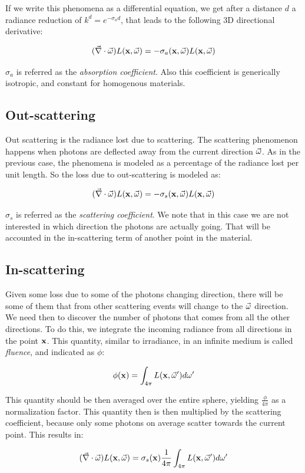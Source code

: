 If we write this phenomena as a differential equation, we get after a distance $d$ a radiance reduction of $k^d = e^{-\sigma_a d}$, that leads to the following 3D directional derivative:

$$
(\vec{\nabla} \cdot \vec{\omega}) L(\mathbf{x}, \vec{\omega}) = -\sigma_a(\mathbf{x},\vec{\omega}) L(\mathbf{x}, \vec{\omega})
$$

$\sigma_a$ is referred as the \emph{absorption coefficient}. Also this coefficient is generically isotropic, and constant for homogenous materials.

\subsection{Out-scattering}
Out scattering is the radiance lost due to scattering. The scattering phenomenon happens when photons are deflected away from the current direction $\vec{\omega}$.  As in the previous case, the phenomena is modeled as a percentage of the radiance lost per unit length. So the loss due to out-scattering is modeled as:

$$
(\vec{\nabla} \cdot \vec{\omega}) L(\mathbf{x}, \vec{\omega}) = -\sigma_s(\mathbf{x},\vec{\omega}) L(\mathbf{x}, \vec{\omega})
$$

$\sigma_s$ is referred as the \emph{scattering coefficient}. We note that in this case we are not interested in which direction the photons are actually going. That will be accounted in the in-scattering term of another point in the material.

\subsection{In-scattering}
Given some loss due to some of the photons changing direction, there will be some of them that from other scattering events will change to the $\vec{\omega}$ direction. We need then to discover the number of photons that comes from all the other directions. To do this, we integrate the incoming radiance from all directions in the point $\mathbf{x}$. This quantity, similar to irradiance, in an infinite medium is called \emph{fluence}, and indicated as $\phi$:

$$
\phi(\mathbf{x}) = \int_{4\pi} L(\mathbf{x},\vec{\omega}') d\omega'
$$

This quantity should be then averaged over the entire sphere, yielding $\frac{\phi}{4\pi}$ as a normalization factor. This quantity then is then multiplied by the scattering coefficient, because only some photons on average scatter towards the current point. This results in:

\begin{equation}
(\vec{\nabla} \cdot \vec{\omega}) L(\mathbf{x}, \vec{\omega}) = \sigma_s(\mathbf{x}) \frac{1}{4 \pi} \int_{4\pi} L(\mathbf{x},\vec{\omega}') d\omega'	
\label{eq:inscatter}
\end{equation}

